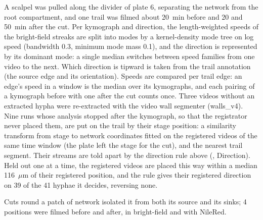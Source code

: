 A scalpel was pulled along the divider of plate 6, separating the network from the root compartment, and one trail was filmed about 20~min before and 20 and 50~min after the cut.
Per kymograph and direction, the length-weighted speeds of the bright-field streaks are split into modes by a kernel-density mode tree on log speed (bandwidth 0.3, minimum mode mass 0.1), and the direction is represented by its dominant mode: a single median switches between speed families from one video to the next.
Which direction is tipward is taken from the trail annotation (the source edge and its orientation).
Speeds are compared per trail edge: an edge's speed in a window is the median over its kymographs, and each pairing of a kymograph before with one after the cut counts once.
Three videos without an extracted hypha were re-extracted with the video wall segmenter (walls\_v4).
Nine runs whose analysis stopped after the kymograph, so that the registrator never placed them, are put on the trail by their stage position: a similarity transform from stage to network coordinates fitted on the registered videos of the same time window (the plate left the stage for the cut), and the nearest trail segment.
Their streams are told apart by the direction rule above (, Direction).
Held out one at a time, the registered videos are placed this way within a median 116~$\mu$m of their registered position, and the rule gives their registered direction on 39 of the 41 hyphae it decides, reversing none.

Cuts round a patch of network isolated it from both its source and its sinks; 4 positions were filmed before and after, in bright-field and with NileRed.

